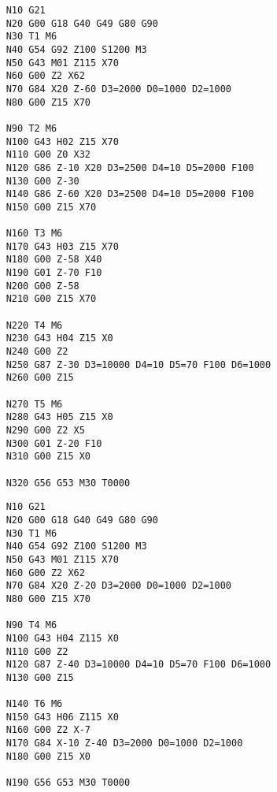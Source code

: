\begin{verbatim}
    N10 G21
    N20 G00 G18 G40 G49 G80 G90
    N30 T1 M6
    N40 G54 G92 Z100 S1200 M3
    N50 G43 M01 Z115 X70
    N60 G00 Z2 X62
    N70 G84 X20 Z-60 D3=2000 D0=1000 D2=1000
    N80 G00 Z15 X70

    N90 T2 M6
    N100 G43 H02 Z15 X70
    N110 G00 Z0 X32
    N120 G86 Z-10 X20 D3=2500 D4=10 D5=2000 F100
    N130 G00 Z-30
    N140 G86 Z-60 X20 D3=2500 D4=10 D5=2000 F100
    N150 G00 Z15 X70

    N160 T3 M6
    N170 G43 H03 Z15 X70
    N180 G00 Z-58 X40
    N190 G01 Z-70 F10
    N200 G00 Z-58
    N210 G00 Z15 X70

    N220 T4 M6
    N230 G43 H04 Z15 X0
    N240 G00 Z2
    N250 G87 Z-30 D3=10000 D4=10 D5=70 F100 D6=1000
    N260 G00 Z15

    N270 T5 M6
    N280 G43 H05 Z15 X0
    N290 G00 Z2 X5
    N300 G01 Z-20 F10
    N310 G00 Z15 X0

    N320 G56 G53 M30 T0000
\end{verbatim}

\begin{verbatim}
    N10 G21
    N20 G00 G18 G40 G49 G80 G90
    N30 T1 M6
    N40 G54 G92 Z100 S1200 M3
    N50 G43 M01 Z115 X70
    N60 G00 Z2 X62
    N70 G84 X20 Z-20 D3=2000 D0=1000 D2=1000
    N80 G00 Z15 X70

    N90 T4 M6
    N100 G43 H04 Z115 X0
    N110 G00 Z2
    N120 G87 Z-40 D3=10000 D4=10 D5=70 F100 D6=1000
    N130 G00 Z15

    N140 T6 M6
    N150 G43 H06 Z115 X0
    N160 G00 Z2 X-7
    N170 G84 X-10 Z-40 D3=2000 D0=1000 D2=1000
    N180 G00 Z15 X0

    N190 G56 G53 M30 T0000
\end{verbatim}
